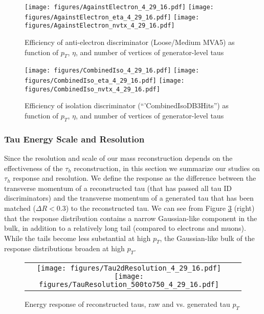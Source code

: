 \begin{figure}[tbh!]
    \centering
   
      \texttt{[image: figures/AgainstElectron\_4\_29\_16.pdf]}
      \texttt{[image: figures/AgainstElectron\_eta\_4\_29\_16.pdf]}
       \texttt{[image: figures/AgainstElectron\_nvtx\_4\_29\_16.pdf]}

    \caption{Efficiency of anti-electron discriminator (Loose/Medium MVA5) as function of $p_{T}$, $\eta$, and number of vertices of generator-level taus }
    \label{fig:EM5}
  \end{figure}

\begin{figure}[tbh!]
    \centering
    
      \texttt{[image: figures/CombinedIso\_4\_29\_16.pdf]}
      \texttt{[image: figures/CombinedIso\_eta\_4\_29\_16.pdf]}
       \texttt{[image: figures/CombinedIso\_nvtx\_4\_29\_16.pdf]}
    
    \caption{Efficiency of isolation discriminator (``'CombinedIsoDB3Hits'') as function of $p_{T}$, $\eta$, and number of vertices of generator-level taus }
    \label{fig:TIso}
  \end{figure}



\subsubsection{Tau Energy Scale and Resolution}

Since the resolution and scale of our mass reconstruction depends on the effectiveness of the $\tau_{h}$ reconstruction, in this section we summarize our studies on $\tau_{h}$ response and resolution. We define the response as the difference between the transverse momentum of a reconstructed tau (that has passed all tau ID discriminators) and the transverse momentum of a generated tau that has been matched ($\Delta R < 0.3$) to the reconstructed tau. We can see from Figure \ref{fig:Tau2dResolution} (right) that the response distribution contains a narrow Gaussian-like component in the bulk, in addition to a relatively long tail (compared to electrons and muons). While the tails become less substantial at high $p_{T}$, the Gaussian-like bulk of the response distributions broaden at high $p_{T}$.
 
\begin{figure}[tbh!]
  \centering
  \begin{tabular}{cc}
  \texttt{[image: figures/Tau2dResolution\_4\_29\_16.pdf]}
  \texttt{[image: figures/TauResolution\_500to750\_4\_29\_16.pdf]}
  \end{tabular}
  \caption{Energy response of reconstructed taus, raw and vs. generated tau $p_{T}$}
  \label{fig:Tau2dResolution}
\end{figure}


